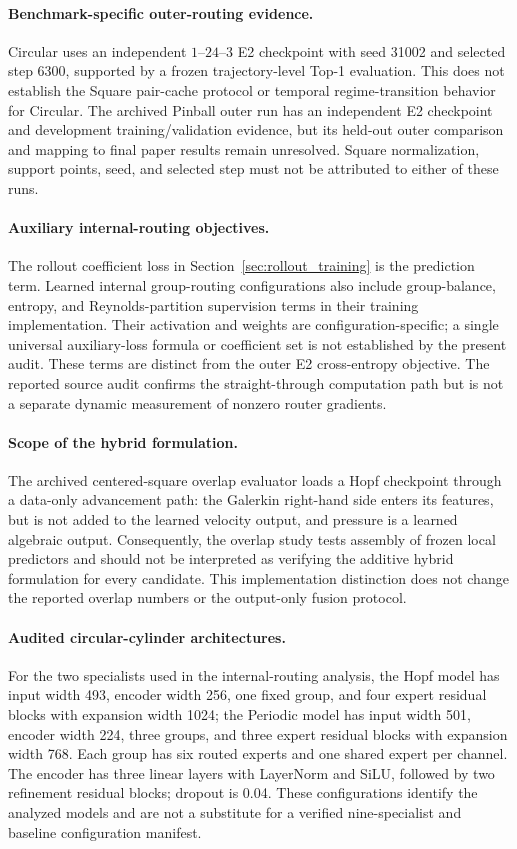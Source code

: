 \paragraph{Benchmark-specific outer-routing evidence.}
Circular uses an independent $1$--$24$--$3$ E2 checkpoint with
seed 31002 and selected step 6300, supported by a frozen
trajectory-level Top-1 evaluation. This does not establish the
Square pair-cache protocol or temporal regime-transition behavior
for Circular. The archived Pinball outer run has an independent
E2 checkpoint and development training/validation evidence, but its
held-out outer comparison and mapping to final paper results remain
unresolved. Square normalization, support points, seed, and selected
step must not be attributed to either of these runs.

\paragraph{Auxiliary internal-routing objectives.}
The rollout coefficient loss in Section~\ref{sec:rollout_training}
is the prediction term. Learned internal group-routing configurations
also include group-balance, entropy, and Reynolds-partition supervision
terms in their training implementation. Their activation and weights
are configuration-specific; a single universal auxiliary-loss formula
or coefficient set is not established by the present audit.
These terms are distinct from the outer E2 cross-entropy objective.
The reported source audit confirms the straight-through computation
path but is not a separate dynamic measurement of nonzero router
gradients.

\paragraph{Scope of the hybrid formulation.}
The archived centered-square overlap evaluator loads a Hopf checkpoint through a data-only advancement path: the Galerkin right-hand side enters its features, but is not added to the learned velocity output, and pressure is a learned algebraic output. Consequently, the overlap study tests assembly of frozen local predictors and should not be interpreted as verifying the additive hybrid formulation for every candidate. This implementation distinction does not change the reported overlap numbers or the output-only fusion protocol.

\paragraph{Audited circular-cylinder architectures.}
For the two specialists used in the internal-routing analysis, the Hopf model has input width 493, encoder width 256, one fixed group, and four expert residual blocks with expansion width 1024; the Periodic model has input width 501, encoder width 224, three groups, and three expert residual blocks with expansion width 768. Each group has six routed experts and one shared expert per channel. The encoder has three linear layers with LayerNorm and SiLU, followed by two refinement residual blocks; dropout is 0.04. These configurations identify the analyzed models and are not a substitute for a verified nine-specialist and baseline configuration manifest.

